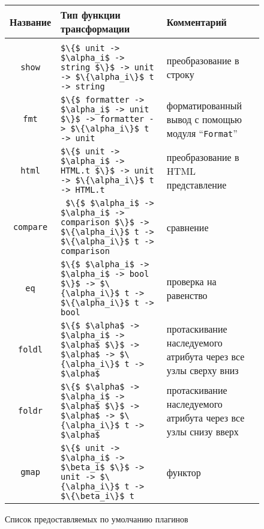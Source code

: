 \begin{figure}[t]
  \center
  \small
  \begin{tabular}{cp{9cm}p{5cm}}
    Название & Тип функции трансформации & Комментарий \\[3mm]
    \hline\\
    \lstinline|show| & \lstinline|$\{$ unit -> $\alpha_i$ -> string $\}$ -> unit -> $\{\alpha_i\}$ t -> string| & преобразование в строку\\[2mm]
    \lstinline|fmt| & \lstinline|$\{$ formatter -> $\alpha_i$ -> unit $\}$ -> formatter -> $\{\alpha_i\}$ t -> unit| & форматированный вывод с помощью модуля ``\lstinline|Format|'' \\[2mm]
    \lstinline|html| & \lstinline|$\{$ unit -> $\alpha_i$ -> HTML.t $\}$ -> unit  -> $\{\alpha_i\}$ t -> HTML.t| & преобразование в HTML представление \\[2mm]
    \lstinline|compare| & \lstinline| $\{$ $\alpha_i$ -> $\alpha_i$ -> comparison $\}$ -> $\{\alpha_i\}$ t -> $\{\alpha_i\}$ t -> comparison| & сравнение \\[2mm]
    \lstinline|eq| & \lstinline|$\{$ $\alpha_i$ -> $\alpha_i$ -> bool $\}$ -> $\{\alpha_i\}$ t -> $\{\alpha_i\}$ t -> bool| & проверка на равенство \\[2mm]
    \lstinline|foldl| & \lstinline |$\{$ $\alpha$ -> $\alpha_i$ -> $\alpha$ $\}$ -> $\alpha$ -> $\{\alpha_i\}$ t -> $\alpha$| & протаскивание наследуемого атрибута через все узлы сверху вниз \\[2mm]
    \lstinline|foldr| & \lstinline |$\{$ $\alpha$ -> $\alpha_i$ -> $\alpha$ $\}$ -> $\alpha$ -> $\{\alpha_i\}$ t -> $\alpha$| & протаскивание наследуемого атрибута через все узлы снизу вверх \\[2mm]
    \lstinline|gmap| & \lstinline|$\{$ unit -> $\alpha_i$ -> $\beta_i$ $\}$ -> unit -> $\{\alpha_i\}$ t -> $\{\beta_i\}$ t| & функтор %
  \end{tabular}
  \caption{Список предоставляемых по умолчанию плагинов}
  \label{listofplugins}
\end{figure}

